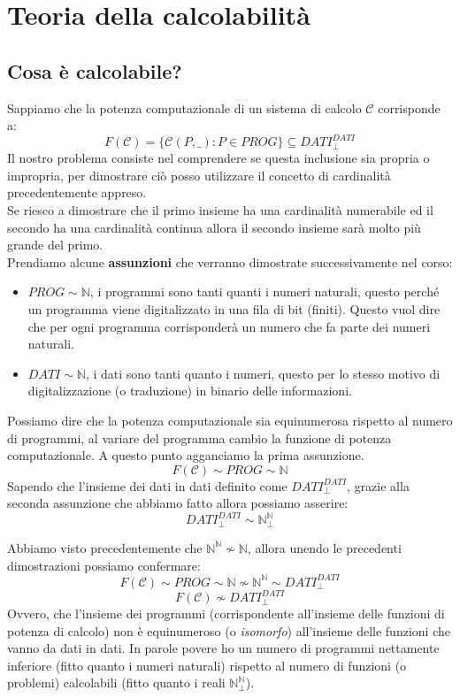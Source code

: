 \documentclass{article}
\begin{document}
\section{Teoria della calcolabilità}
\subsection{Cosa è calcolabile?}
Sappiamo che la potenza computazionale di un sistema di calcolo $\mathcal{C}$ corrisponde a:
$$F(\mathcal{C})=\{\mathcal{C}(P,\_):P\in PROG\}\subseteq DATI_{\bot}^{DATI}$$
Il nostro problema consiste nel comprendere se questa inclusione sia propria o impropria,
per dimostrare ciò posso utilizzare il concetto di cardinalità precedentemente appreso.\\
Se riesco a dimostrare che il primo insieme ha una cardinalità numerabile ed il secondo ha
una cardinalità continua allora il secondo insieme sarà molto più grande del primo.\\Prendiamo alcune
\textbf{assunzioni} che verranno dimostrate successivamente nel corso:
\begin{itemize}
    \item $PROG\sim\mathbb{N}$, i programmi sono tanti quanti i numeri naturali, questo
          perché un programma viene digitalizzato in una fila di bit (finiti). Questo vuol dire che per ogni
          programma corrisponderà un numero che fa parte dei numeri naturali.

    \item $DATI\sim\mathbb{N}$, i dati sono tanti quanto i numeri, questo per lo stesso motivo
          di digitalizzazione (o traduzione) in binario delle informazioni.
\end{itemize}
Possiamo dire che la potenza computazionale sia equinumerosa rispetto al numero di programmi,
al variare del programma cambio la funzione di potenza computazionale. A questo punto agganciamo
la prima assunzione.
$$F(\mathcal{C})\sim PROG\sim\mathbb{N}$$
Sapendo che l'insieme dei dati in dati definito come $DATI_{\bot}^{DATI}$, grazie alla
seconda assunzione che abbiamo fatto allora possiamo asserire:
$$DATI_{\bot}^{DATI}\sim\mathbb{N}_{\bot}^{\mathbb{N}}$$

Abbiamo visto precedentemente che $\mathbb{N}^{\mathbb{N}}\nsim\mathbb{N}$, allora unendo le precedenti
dimostrazioni possiamo confermare:
$$F(\mathcal{C})\sim PROG\sim\mathbb{N}\nsim\mathbb{N}^{\mathbb{N}}\sim DATI_{\bot}^{DATI}$$
$$F(\mathcal{C})\nsim DATI_{\bot}^{DATI}$$
Ovvero, che l'insieme dei programmi (corrispondente all'insieme delle funzioni di potenza di calcolo)
non è equinumeroso (o \textit{isomorfo}) all'insieme delle funzioni che vanno da dati in dati. In parole
povere ho un numero di programmi nettamente inferiore (fitto quanto i numeri naturali) rispetto al numero
di funzioni (o problemi) calcolabili (fitto quanto i reali $\mathbb{N}_{\bot}^{\mathbb{N}}$).
\end{document}
